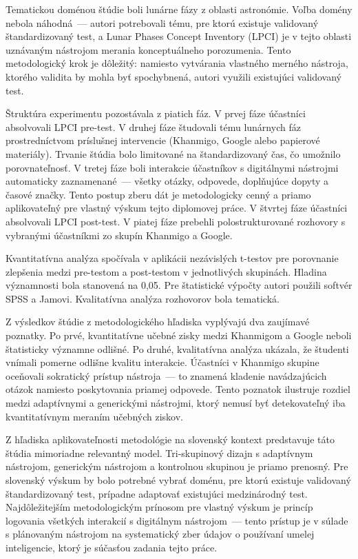Tematickou doménou štúdie boli lunárne fázy z oblasti astronómie. Voľba domény nebola náhodná~--- autori potrebovali tému, pre ktorú existuje validovaný štandardizovaný test, a Lunar Phases Concept Inventory (LPCI) je v tejto oblasti uznávaným nástrojom merania konceptuálneho porozumenia. Tento metodologický krok je dôležitý: namiesto vytvárania vlastného merného nástroja, ktorého validita by mohla byť spochybnená, autori využili existujúci validovaný test.

Štruktúra experimentu pozostávala z piatich fáz. V prvej fáze účastníci absolvovali LPCI pre-test. V druhej fáze študovali tému lunárnych fáz prostredníctvom príslušnej intervencie (Khanmigo, Google alebo papierové materiály). Trvanie štúdia bolo limitované na štandardizovaný čas, čo umožnilo porovnateľnosť. V tretej fáze boli interakcie účastníkov s digitálnymi nástrojmi automaticky zaznamenané~--- všetky otázky, odpovede, doplňujúce dopyty a časové značky. Tento postup zberu dát je metodologicky cenný a priamo aplikovateľný pre vlastný výskum tejto diplomovej práce. V štvrtej fáze účastníci absolvovali LPCI post-test. V piatej fáze prebehli polostrukturované rozhovory s vybranými účastníkmi zo skupín Khanmigo a Google.

Kvantitatívna analýza spočívala v aplikácii nezávislých t-testov pre porovnanie zlepšenia medzi pre-testom a post-testom v jednotlivých skupinách. Hladina významnosti bola stanovená na 0,05. Pre štatistické výpočty autori použili softvér SPSS a Jamovi. Kvalitatívna analýza rozhovorov bola tematická.

Z výsledkov štúdie z metodologického hľadiska vyplývajú dva zaujímavé poznatky. Po prvé, kvantitatívne učebné zisky medzi Khanmigom a Google neboli štatisticky významne odlišné. Po druhé, kvalitatívna analýza ukázala, že študenti vnímali pomerne odlišne kvalitu interakcie. Účastníci v Khanmigo skupine oceňovali sokratický prístup nástroja~--- to znamená kladenie navádzajúcich otázok namiesto poskytovania priamej odpovede. Tento poznatok ilustruje rozdiel medzi adaptívnymi a generickými nástrojmi, ktorý nemusí byť detekovateľný iba kvantitatívnym meraním učebných ziskov.

Z hľadiska aplikovateľnosti metodológie na slovenský kontext predstavuje táto štúdia mimoriadne relevantný model. Tri-skupinový dizajn s adaptívnym nástrojom, generickým nástrojom a kontrolnou skupinou je priamo prenosný. Pre slovenský výskum by bolo potrebné vybrať doménu, pre ktorú existuje validovaný štandardizovaný test, prípadne adaptovať existujúci medzinárodný test. Najdôležitejším metodologickým prínosom pre vlastný výskum je princíp logovania všetkých interakcií s digitálnym nástrojom~--- tento prístup je v súlade s plánovaným nástrojom na systematický zber údajov o používaní umelej inteligencie, ktorý je súčasťou zadania tejto práce.


